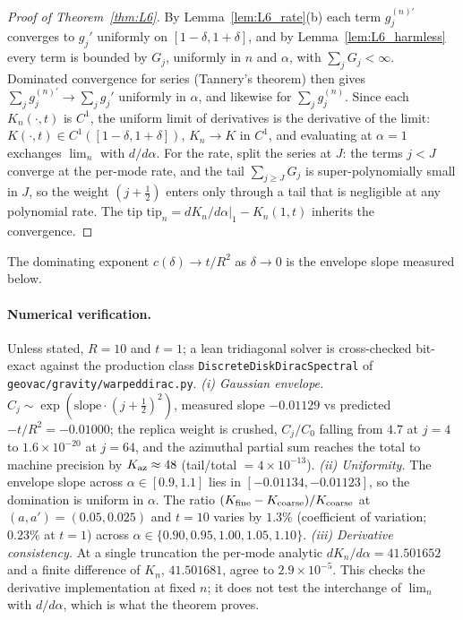 \documentclass[11pt,a4paper]{article}
\theoremstyle{plain}
\theoremstyle{definition}
\renewcommand{\_}{\textunderscore\allowbreak}
\begin{document}
\begin{proof}[Proof of Theorem~\ref{thm:L6}]
By Lemma~\ref{lem:L6_rate}(b) each term $g_j^{(n)\prime}$ converges to
$g_j'$ uniformly on $[1-\delta,1+\delta]$, and by
Lemma~\ref{lem:L6_harmless} every term is bounded by $G_j$, uniformly in
$n$ and $\alpha$, with $\sum_j G_j<\infty$. Dominated convergence for series
(Tannery's theorem) then gives $\sum_j g_j^{(n)\prime}\to\sum_j g_j'$
uniformly in $\alpha$, and likewise for $\sum_j g_j^{(n)}$. Since each
$K_n(\cdot,t)$ is $C^1$, the uniform limit of derivatives is the derivative
of the limit: $K(\cdot,t)\in C^1([1-\delta,1+\delta])$, $K_n\to K$ in $C^1$,
and evaluating at $\alpha=1$ exchanges $\lim_n$ with $d/d\alpha$. For the
rate, split the series at $J$: the terms $j<J$ converge at the per-mode rate,
and the tail $\sum_{j\ge J}G_j$ is super-polynomially small in $J$, so the
weight $(j+\tfrac12)$ enters only through a tail that is negligible at any
polynomial rate. The tip $\mathrm{tip}_n=dK_n/d\alpha|_1-K_n(1,t)$ inherits
the convergence.
\end{proof}

\noindent The dominating exponent $c(\delta)\to t/R^2$ as $\delta\to0$ is
the envelope slope measured below.

\paragraph{Numerical verification.} Unless stated, $R=10$ and $t=1$; a
lean tridiagonal solver is cross-checked bit-exact against the production
class \texttt{DiscreteDiskDiracSpectral} of
\texttt{geovac/gravity/warped\_dirac.py}.
\emph{(i) Gaussian envelope.} $C_j\sim\exp(\text{slope}\cdot(j+\tfrac12)^2)$,
measured slope $-0.01129$ vs predicted $-t/R^2=-0.01000$; the replica weight is
crushed, $C_j/C_0$ falling from $4.7$ at $j{=}4$ to $1.6\times10^{-20}$ at
$j{=}64$, and the azimuthal partial sum reaches the total to machine precision
by $K_{\rm az}\approx48$ (tail/total $=4\times10^{-13}$).
\emph{(ii) Uniformity.} The envelope slope across $\alpha\in[0.9,1.1]$ lies in
$[-0.01134,-0.01123]$, so the domination is uniform in $\alpha$. The ratio
$(K_{\rm fine}-K_{\rm coarse})/K_{\rm coarse}$ at $(a,a')=(0.05,0.025)$ and
$t=10$ varies by $1.3\%$ (coefficient of variation; $0.23\%$ at $t=1$) across
$\alpha\in\{0.90,0.95,1.00,1.05,1.10\}$.
\emph{(iii) Derivative consistency.} At a single truncation the per-mode
analytic $dK_n/d\alpha = 41.501652$ and a finite difference of $K_n$,
$41.501681$, agree to $2.9\times10^{-5}$. This checks the derivative
implementation at fixed $n$; it does not test the interchange of
$\lim_n$ with $d/d\alpha$, which is what the theorem proves.
\end{document}
